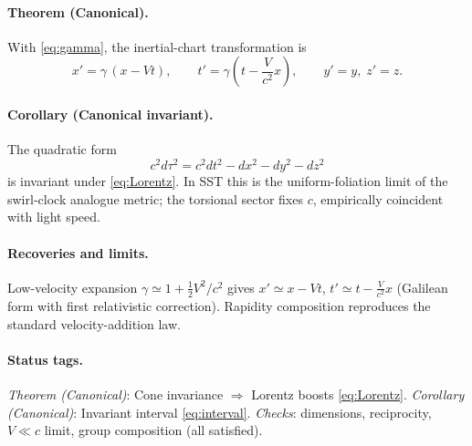 \documentclass[10pt,reprint,aps,onecolumn,nofootinbib]{revtex4-2}
\begin{document}
        \paragraph{Theorem (Canonical).}
            With \eqref{eq:gamma}, the inertial-chart transformation is
            \begin{equation}
                \boxed{~x'=\gamma\,(x - Vt),\qquad t'=\gamma\!\left(t - \frac{V}{c^{2}}x\right),\qquad y'=y,\; z'=z.~} \label{eq:Lorentz}
            \end{equation}

        \paragraph{Corollary (Canonical invariant).}
            The quadratic form
            \begin{equation}
                \boxed{~c^2 d\tau^2 = c^2 dt^2 - dx^2 - dy^2 - dz^2~} \label{eq:interval}
            \end{equation}
            is invariant under \eqref{eq:Lorentz}. In SST this is the uniform-foliation limit of the swirl-clock analogue metric; the torsional sector fixes $c$, empirically coincident with light speed.

        \paragraph{Recoveries and limits.}
            Low-velocity expansion $\gamma\simeq 1+\tfrac{1}{2}V^2/c^2$ gives $x'\simeq x-Vt$, $t'\simeq t-\tfrac{V}{c^{2}}x$ (Galilean form with first relativistic correction). Rapidity composition reproduces the standard velocity-addition law.

        \paragraph{Status tags.}
            \emph{Theorem (Canonical)}: Cone invariance $\Rightarrow$ Lorentz boosts \eqref{eq:Lorentz}. \;
            \emph{Corollary (Canonical)}: Invariant interval \eqref{eq:interval}. \;
            \emph{Checks}: dimensions, reciprocity, $V\!\ll\!c$ limit, group composition (all satisfied).


\end{document}
